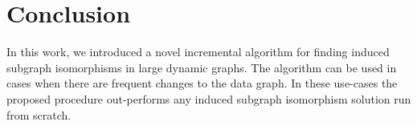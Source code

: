 \chapter{Conclusion}

In this work, we introduced a novel incremental algorithm for finding induced subgraph isomorphisms in large dynamic graphs.
The algorithm can be used in cases when there are frequent changes to the data graph. In these use-cases the proposed procedure
out-performs any induced subgraph isomorphism solution run from scratch.